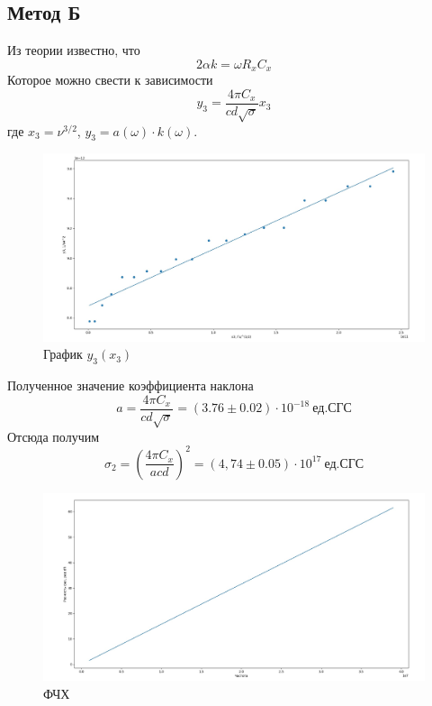 \documentclass[a4paper,12pt]{article}
\theoremstyle{definition}
\begin{document}
	\subsection{Метод Б}
	Из теории известно, что 
	\begin{equation}
		2\alpha k=\omega R_xC_x
	\end{equation}
	Которое можно свести к зависимости
	\begin{equation}
		y_3=\frac{4\pi C_x}{cd\sqrt{\sigma}}x_3
	\end{equation}
	где $x_3=\nu^{3/2}$, $y_3=a(\omega) \cdot k(\omega)$.
	\begin{figure}[h!]
		\centering
		\includegraphics[scale=0.3]{5.jpg}
		\caption{График $y_3(x_3)$}
	\end{figure}

	Полученное значение коэффициента наклона
	\[a=\frac{4\pi C_x}{cd\sqrt{\sigma}}=(3.76\pm0.02)\cdot10^{-18}\:\text{ед.СГС}\]
	Отсюда получим
	\begin{equation}
		\sigma_2=\left(\frac{4\pi C_x}{acd}\right)^2=(4,74\pm0.05)\cdot10^{17}\:\text{ед.СГС}
	\end{equation}
\newpage
	\begin{figure}[h!]
		\centering
		\includegraphics[scale=0.3]{6.jpg}
		\caption{ФЧХ}
	\end{figure}
\end{document}
